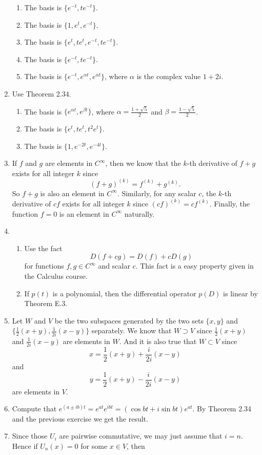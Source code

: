 \begin{enumerate}
\begin{enumerate}
\item The basis is $\{e^{-t},te^{-t}\}$.
\item The basis is $\{1,e^{t},e^{-t}\}$.
\item The basis is $\{e^t,te^t,e^{-t},te^{-t}\}$.
\item The basis is $\{e^{-t},te^{-t}\}$.
\item The basis is $\{e^{-t},e^{\alpha t},e^{\overline{\alpha}t}\}$, where $\alpha $ is the complex value $1+2i$.
\end{enumerate}
\item Use Theorem 2.34.\begin{enumerate}
\item The basis is $\{e^{\alpha t},e^{\beta t}\}$, where $\alpha =\frac{1+\sqrt{5}}{2}$ and $\beta=\frac{1-\sqrt{5}}{2}$.
\item The basis is $\{e^t,te^t,t^2e^t\}$.
\item The basis is $\{1,e^{-2t},e^{-4t}\}$.
\end{enumerate}
\item If $f$ and $g$ are elements in $C^{\infty}$, then we know that the $k$-th derivative of $f+g$ exists for all integer $k$ since 
\[(f+g)^{(k)}=f^{(k)}+g^{(k)}.\]
So $f+g$ is also an element in $C^{\infty}$. Similarly, for any scalar $c$, the $k$-th derivative of $cf$ exists for all integer $k$ since $(cf)^{(k)}=cf^{(k)}$. Finally, the function $f=0$ is an element in $C^{\infty}$ naturally.
\item \begin{enumerate}
\item Use the fact 
\[D(f+cg)=D(f)+cD(g)\]
for functions $f,g\in C^{\infty}$ and scalar $c$. This fact is a easy property given in the Calculus course.
\item If $p(t)$ is a polynomial, then the differential operator $p(D)$ is linear by Theorem E.3.
\end{enumerate}
\item Let $W$ and $V$ be the two subspaces generated by the two sets $\{x,y\}$ and $\{\frac{1}{2}(x+y),\frac{1}{2i}(x-y)\}$ separately. We know that $W\supset V$ since $\frac{1}{2}(x+y)$ and $\frac{1}{2i}(x-y)$ are elements in $W$. And it is also true that $W\subset V$ since 
\[x=\frac{1}{2}(x+y)+\frac{i}{2i}(x-y)\]
and 
\[y=\frac{1}{2}(x+y)-\frac{i}{2i}(x-y)\]
are elements in $V$.
\item Compute that $e^{(a\pm ib)t}=e^{at}e^{ibt}=(\cos bt+i\sin bt)e^{at}$. By Theorem 2.34 and the previous exercise we get the result.
\item Since those $U_i$ are pairwise commutative, we may just assume that $i=n$. Hence if $U_n(x)=0$ for some $x\in V$, then 

\end{enumerate}
